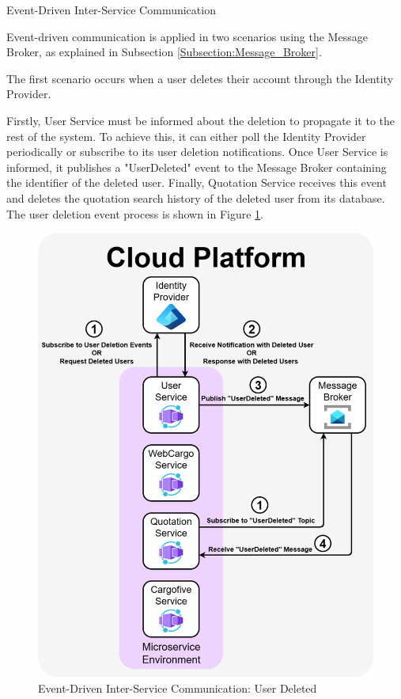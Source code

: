 \documentclass[12pt, reqno, oneside]{amsbook}
\makeatletter
\def\subsection{\@startsection{subsection}{2}%
      \z@{.5\linespacing\@plus.7\linespacing}{.25\linespacing}%
      {\normalfont\bfseries\flushleft}}
\theoremstyle{definition}
\theoremstyle{definition}
\numberwithin{section}{chapter}
\numberwithin{table}{chapter}
\numberwithin{figure}{chapter}
\makeatother
\begin{document}
\subsection{Event-Driven Inter-Service Communication}
\label{Subsection:Event_Driven_Inter_Service_Communication}

Event-driven communication is applied in two scenarios using the Message Broker, as explained in Subsection \ref{Subsection:Message_Broker}.

The first scenario occurs when a user deletes their account through the Identity Provider.

Firstly, User Service must be informed about the deletion to propagate it to the rest of the system. To achieve this, it can either poll the Identity Provider periodically or subscribe to its user deletion notifications. Once User Service is informed, it publishes a "UserDeleted" event to the Message Broker containing the identifier of the deleted user. Finally, Quotation Service receives this event and deletes the quotation search history of the deleted user from its database. The user deletion event process is shown in Figure \ref{Figure:EventDrivenCommunicationUserDeleted}.

\begin{figure}[H]
  \centering
  \includegraphics[width=0.9\linewidth]{images/EventDrivenCommunicationUserDeleted.png}
  \caption{\label{Figure:EventDrivenCommunicationUserDeleted}Event-Driven Inter-Service Communication: User Deleted}
\end{figure}
\end{document}
